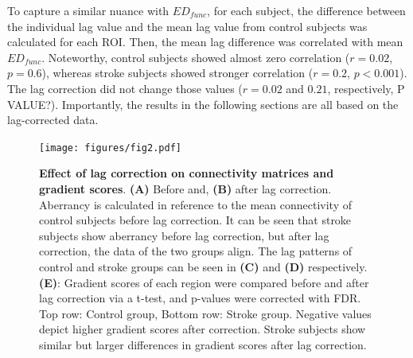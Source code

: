 \documentclass[fleqn,10pt]{wlscirep}
\begin{document}
To capture a similar nuance with $\textit{ED}_{{func}}$, for each subject, the difference between the individual lag value and the mean lag value from control subjects was calculated for each ROI. Then, the mean lag difference was correlated with mean $\textit{ED}_{{func}}$. Noteworthy, control subjects showed almost zero correlation ($r = 0.02$, $ p = 0.6$), whereas stroke subjects showed stronger correlation ($r = 0.2$, $p < 0.001$). The lag correction did not change those values ($r = 0.02$ and $0.21$, respectively, \color{purple} P VALUE?\color{black}). Importantly, the results in the following sections are all based on the lag-corrected data.

\begin{figure}[]
\centering
\texttt{[image: figures/fig2.pdf]}
\caption{\label{fig:lag_abr} \textbf{Effect of lag correction on connectivity matrices and gradient scores}.  \textbf{(A)} Before and, \textbf{(B)} after lag correction.
Aberrancy is calculated in reference to the mean connectivity of control subjects before lag correction. It can be seen that
stroke subjects show aberrancy before lag correction, but after lag correction, the data of the two groups align. The lag patterns
of control and stroke groups can be seen in \textbf{(C)} and \textbf{(D)} respectively. \textbf{(E)}:  Gradient scores of each region were compared before and after lag correction via a t-test, and p-values were corrected with FDR. Top row: Control group, Bottom row: Stroke group. Negative values depict higher gradient scores after correction. Stroke subjects show similar but larger differences in gradient scores after lag correction.}
\end{figure}
\end{document}
